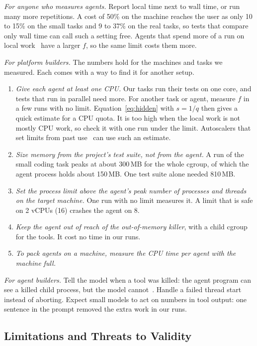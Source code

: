 \documentclass[sigconf,review,anonymous]{acmart}
\begin{document}
\emph{For anyone who measures agents.} Report local time next to wall
time, or run many more repetitions. A cost of 50\% on the machine
reaches the user as only 10 to 15\% on the small tasks and 9 to 37\% on
the real tasks, so tests that compare only wall time can call such a
setting free. Agents that spend more of a run on local
work~\cite{fan2025} have a larger $f$, so the same limit costs them
more.

\emph{For platform builders.} The numbers hold for the machines and
tasks we measured. Each comes with a way to find it for another setup.
\begin{enumerate}
\item \emph{Give each agent at least one CPU.} Our tasks run their
  tests on one core, and tests that run in parallel need more. For another task or agent, measure $f$ in a few runs with no
  limit. Equation~\ref{eq:hidden} with $s = 1/q$ then gives a quick
  estimate for a CPU quota. It is too high when the local work is not
  mostly CPU work, so check it with one run under the limit. Autoscalers
  that set limits from past use~\cite{rzadca2020} can use such an
  estimate.
\item \emph{Size memory from the project's test suite, not from the
  agent.} A run of the small coding task peaks at about 300\,MB for the
  whole cgroup, of which the agent process holds about 150\,MB. One
  test suite alone needed 810\,MB.
\item \emph{Set the process limit above the agent's peak number of
  processes and threads on the target machine.} One run with no limit
  measures it. A limit that is safe on 2 vCPUs (16) crashes the agent on
  8.
\item \emph{Keep the agent out of reach of the out-of-memory killer},
  with a child cgroup for the tools. It cost no time in our runs.
\item \emph{To pack agents on a machine, measure the CPU time per agent
  with the machine full.}
\end{enumerate}

\emph{For agent builders.} Tell the model when a tool was killed: the
agent program can see a killed child process, but the model
cannot~\cite{song2025}. Handle a failed thread start instead of
aborting. Expect small models to act on numbers in tool output: one
sentence in the prompt removed the extra work in our runs.

\subsection{Limitations and Threats to Validity}\label{sec:threats}
\end{document}
